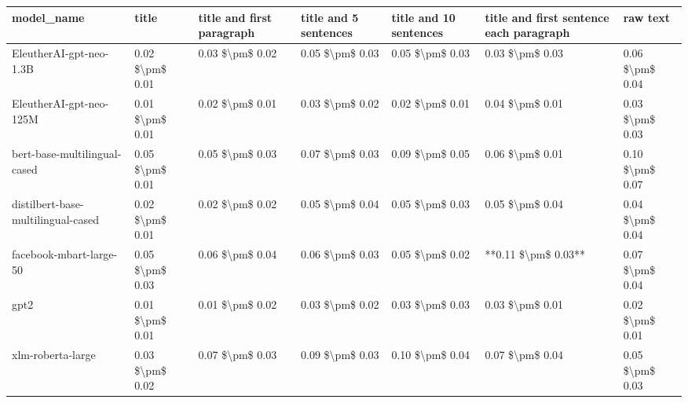 \begin{tabular}{lllllll}
\toprule
                        model\_name &           title & title and first paragraph & title and 5 sentences & title and 10 sentences & title and first sentence each paragraph &        raw text \\
\midrule
           EleutherAI-gpt-neo-1.3B & 0.02 \$\textbackslash pm\$ 0.01 &           0.03 \$\textbackslash pm\$ 0.02 &       0.05 \$\textbackslash pm\$ 0.03 &        0.05 \$\textbackslash pm\$ 0.03 &                         0.03 \$\textbackslash pm\$ 0.03 & 0.06 \$\textbackslash pm\$ 0.04 \\
           EleutherAI-gpt-neo-125M & 0.01 \$\textbackslash pm\$ 0.01 &           0.02 \$\textbackslash pm\$ 0.01 &       0.03 \$\textbackslash pm\$ 0.02 &        0.02 \$\textbackslash pm\$ 0.01 &                         0.04 \$\textbackslash pm\$ 0.01 & 0.03 \$\textbackslash pm\$ 0.03 \\
      bert-base-multilingual-cased & 0.05 \$\textbackslash pm\$ 0.01 &           0.05 \$\textbackslash pm\$ 0.03 &       0.07 \$\textbackslash pm\$ 0.03 &        0.09 \$\textbackslash pm\$ 0.05 &                         0.06 \$\textbackslash pm\$ 0.01 & 0.10 \$\textbackslash pm\$ 0.07 \\
distilbert-base-multilingual-cased & 0.02 \$\textbackslash pm\$ 0.01 &           0.02 \$\textbackslash pm\$ 0.02 &       0.05 \$\textbackslash pm\$ 0.04 &        0.05 \$\textbackslash pm\$ 0.03 &                         0.05 \$\textbackslash pm\$ 0.04 & 0.04 \$\textbackslash pm\$ 0.04 \\
           facebook-mbart-large-50 & 0.05 \$\textbackslash pm\$ 0.03 &           0.06 \$\textbackslash pm\$ 0.04 &       0.06 \$\textbackslash pm\$ 0.03 &        0.05 \$\textbackslash pm\$ 0.02 &                     **0.11 \$\textbackslash pm\$ 0.03** & 0.07 \$\textbackslash pm\$ 0.04 \\
                              gpt2 & 0.01 \$\textbackslash pm\$ 0.01 &           0.01 \$\textbackslash pm\$ 0.02 &       0.03 \$\textbackslash pm\$ 0.02 &        0.03 \$\textbackslash pm\$ 0.03 &                         0.03 \$\textbackslash pm\$ 0.01 & 0.02 \$\textbackslash pm\$ 0.01 \\
                 xlm-roberta-large & 0.03 \$\textbackslash pm\$ 0.02 &           0.07 \$\textbackslash pm\$ 0.03 &       0.09 \$\textbackslash pm\$ 0.03 &        0.10 \$\textbackslash pm\$ 0.04 &                         0.07 \$\textbackslash pm\$ 0.04 & 0.05 \$\textbackslash pm\$ 0.03 \\
\bottomrule
\end{tabular}
